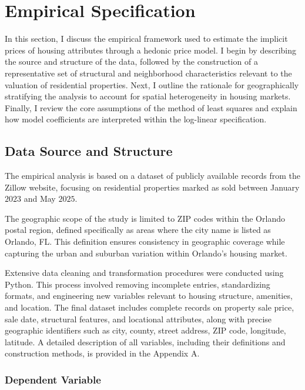 \section*{Empirical Specification}

In this section, I discuss the empirical framework used to estimate the implicit prices of housing attributes through a hedonic price model. I begin by describing the source and structure of the data, followed by the construction of a representative set of structural and neighborhood characteristics relevant to the valuation of residential properties. Next, I outline the rationale for geographically stratifying the analysis to account for spatial heterogeneity in housing markets. Finally, I review the core assumptions of the method of least squares and explain how model coefficients are interpreted within the log-linear specification.

\subsection*{Data Source and Structure}

The empirical analysis is based on a dataset of publicly available records from the Zillow website, focusing on residential properties marked as sold between January $2023$ and May $2025$.

The geographic scope of the study is limited to ZIP codes within the Orlando postal region, defined specifically as areas where the city name is listed as Orlando, FL. This definition ensures consistency in geographic coverage while capturing the urban and suburban variation within Orlando's housing market.

Extensive data cleaning and transformation procedures were conducted using Python. This process involved removing incomplete entries, standardizing formats, and engineering new variables relevant to housing structure, amenities, and location. The final dataset includes complete records on property sale price, sale date, structural features, and locational attributes, along with precise geographic identifiers such as city, county, street address, ZIP code, longitude, latitude. A detailed description of all variables, including their definitions and construction methods, is provided in the Appendix A.

\subsubsection*{Dependent Variable}

